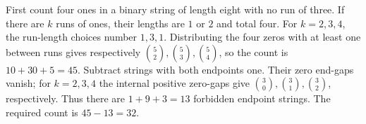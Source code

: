 First count four ones in a binary string of length eight with no run of three. If there are $k$ runs of ones, their lengths are $1$ or $2$ and total four. For $k=2,3,4$, the run-length choices number $1,3,1$. Distributing the four zeros with at least one between runs gives respectively $\binom 52,\binom 53,\binom 54$, so the count is $10+30+5=45$. Subtract strings with both endpoints one. Their zero end-gaps vanish; for $k=2,3,4$ the internal positive zero-gaps give $\binom 30,\binom 31,\binom 32$, respectively. Thus there are $1+9+3=13$ forbidden endpoint strings. The required count is $45-13=\boxed{32}$.
